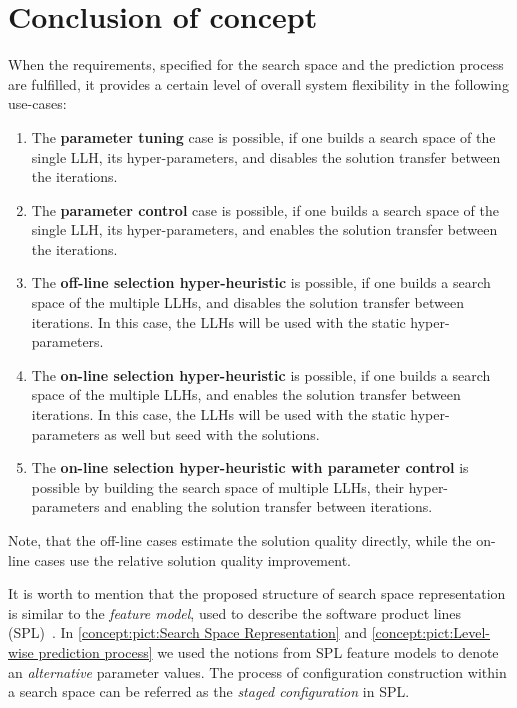 \section{Conclusion of concept}\label{concept: conclution}
When the requirements, specified for the search space and the prediction process are fulfilled, it provides a certain level of overall system flexibility in the following use-cases:
\begin{enumerate}
	\item The \textbf{parameter tuning} case is possible, if one builds a search space of the single LLH, its hyper-parameters, and disables the solution transfer between the iterations.
	
	\item The \textbf{parameter control} case is possible, if one builds a search space of the single LLH, its hyper-parameters, and enables the solution transfer between the iterations. 
	
	\item The \textbf{off-line selection hyper-heuristic} is possible, if one builds a search space of the multiple LLHs, and disables the solution transfer between iterations. In this case, the LLHs will be used with the static hyper-parameters.
	
	\item The \textbf{on-line selection hyper-heuristic} is possible, if one builds a search space of the multiple LLHs, and enables the solution transfer between iterations. In this case, the LLHs will be used with the static hyper-parameters as well but seed with the solutions.
	
	\item The \textbf{on-line selection hyper-heuristic with parameter control} is possible by building the search space of multiple LLHs, their hyper-parameters and enabling the solution transfer between iterations.
\end{enumerate}

Note, that the off-line cases estimate the solution quality directly, while the on-line cases use the relative solution quality improvement.

It is worth to mention that the proposed structure of search space representation is similar to the \emph{feature model}, used to describe the software product lines (SPL)~\cite{schroeter2012multi}. In \cref{concept:pict:Search Space Representation} and \cref{concept:pict:Level-wise prediction process} we used the notions from SPL feature models to denote an \emph{alternative} parameter values. The process of configuration construction within a search space can be referred as the \emph{staged configuration} in SPL.